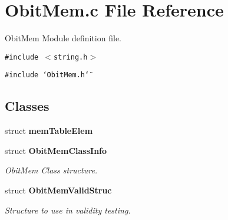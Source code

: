 \section{Obit\-Mem.c File Reference}
\label{ObitMem_8c}
Obit\-Mem Module definition file. 

{\tt \#include $<$string.h$>$}\par
{\tt \#include \char`\"{}Obit\-Mem.h\char`\"{}}\par
\subsection*{Classes}
\begin{CompactItemize}
\item 
struct {\bf mem\-Table\-Elem}
\item 
struct {\bf Obit\-Mem\-Class\-Info}
\begin{CompactList}\small\item\em Obit\-Mem Class structure. \item\end{CompactList}\item 
struct {\bf Obit\-Mem\-Valid\-Struc}
\begin{CompactList}\small\item\em Structure to use in validity testing. \item\end{CompactList}\end{CompactItemize}
